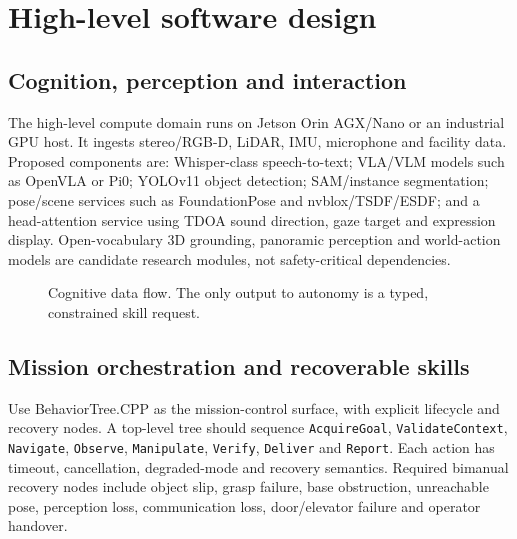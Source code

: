 \documentclass[10pt,a4paper]{article}
\begin{document}
\section{High-level software design}
\subsection{Cognition, perception and interaction}
The high-level compute domain runs on Jetson Orin AGX/Nano or an industrial GPU host. It ingests stereo/RGB-D, LiDAR, IMU, microphone and facility data. Proposed components are: Whisper-class speech-to-text; VLA/VLM models such as OpenVLA or Pi0; YOLOv11 object detection; SAM/instance segmentation; pose/scene services such as FoundationPose and nvblox/TSDF/ESDF; and a head-attention service using TDOA sound direction, gaze target and expression display. Open-vocabulary 3D grounding, panoramic perception and world-action models are candidate research modules, not safety-critical dependencies.

\begin{figure}[ht]
\centering
{}
\caption{Cognitive data flow. The only output to autonomy is a typed, constrained skill request.}
\label{fig:cognition}
\end{figure}

\subsection{Mission orchestration and recoverable skills}
Use BehaviorTree.CPP as the mission-control surface, with explicit lifecycle and recovery nodes. A top-level tree should sequence \texttt{AcquireGoal}, \texttt{ValidateContext}, \texttt{Navigate}, \texttt{Observe}, \texttt{Manipulate}, \texttt{Verify}, \texttt{Deliver} and \texttt{Report}. Each action has timeout, cancellation, degraded-mode and recovery semantics. Required bimanual recovery nodes include object slip, grasp failure, base obstruction, unreachable pose, perception loss, communication loss, door/elevator failure and operator handover.
\end{document}
